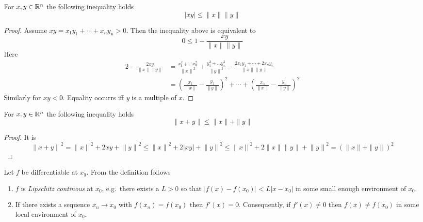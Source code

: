 \begin{lemma}\label{thm:cauchy_schwarz_inequality}
    For \( x, y \in \mathbb{R}^n \) the following inequality holds
    \[
        |xy| \le \|x\| \|y\|
    \]
\end{lemma}
\begin{proof}
    Assume \( xy = x_1 y_1 + \cdots + x_n y_n > 0 \). Then the inequality above is equivalent to
    \[ 0 \le 1 - \frac{xy}{\|x\| \|y\|} \]
    Here
    \[
        \begin{split}
            2 - \frac{2xy}{\|x\| \|y\|}
            & = \frac{x_1^2 + \dots x_n^2}{{\|x\|}^2} +
            \frac{y_1^2 + \dots y_n^2}{{\|y\|}^2} - \frac{2x_1 y_1 + \cdots + 2x_n y_n}{\|x\| \|y\|} \\
            & = {\left( \frac{x_1}{\|x\|} - \frac{y_1}{\|y\|} \right)}^2 + \cdots +
            {\left( \frac{x_n}{\|x\|} - \frac{y_n}{\|y\|} \right)}^2
        \end{split}
        \]
    Similarly for \( xy < 0 \). Equality occurrs iff \( y \) is a multiple of \( x \). 
\end{proof}
\bigskip

\begin{lemma}\label{thm:triangle_inequality}
    For \( x, y \in \mathbb{R}^n \) the following inequality holds
    \[
        \|x + y\| \le \|x\| + \|y\|
    \] 
\end{lemma}
\begin{proof}
    It is 
    \[
        {\|x + y\|}^2 = {\|x\|}^2 + 2xy + {\|y\|}^2 \le {\|x\|}^2 + 2|xy| + {\|y\|}^2 
        \le {\|x\|}^2 + 2\|x\| \|y\| + {\|y\|}^2 = {(\|x\| + \|y\|)}^2
    \]
\end{proof}
\bigskip


\begin{remarks}Let \( f \) be differentiable at \( x_0 \). From the definition follows
    \begin{enumerate}
        \item \( f \) is \emph{Lipschitz continous} at \( x_0 \), e.g.\ there exists a \( L > 0 \) so that
              \( |f(x) - f(x_0)| < L|x - x_0| \) in some small enough environment of \( x_0 \).
        \item If there exists a sequence  \( x_n \to x_0 \) with \( f(x_n) = f(x_0) \) then \( f'(x) = 0 \).
              Consequently, if \( f'(x) \ne 0 \) then \( f(x) \ne f(x_0) \) in some local environment of \( x_0 \).
    \end{enumerate}
\end{remarks}
\bigskip

